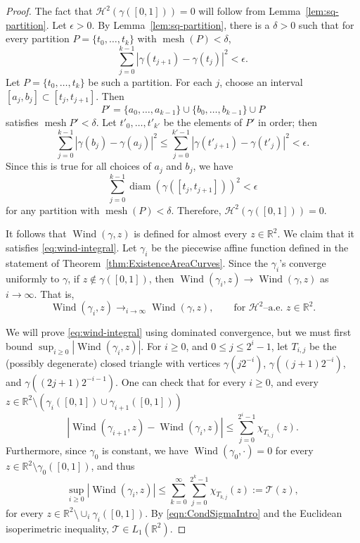 \documentclass[12pt,reqno]{amsart}
\DeclareMathOperator{\mesh}{mesh}
\newcommand{\R}{\mathbb{R}}
\theoremstyle{remark}
\newcommand{\0}{\mathbf{0}}
\renewcommand{\1}{\mathbf 1}
\DeclareMathOperator{\diam}{diam}
\DeclareMathOperator{\Wind}{Wind}
\begin{document}
\begin{proof}
  The fact that $\mathcal{H}^2(\gamma([0,1]))=0$ will follow from Lemma~\ref{lem:sq-partition}. Let $\epsilon>0$. By Lemma~\ref{lem:sq-partition}, there is a $\delta>0$ such that for every partition $P=\{t_0,\dots, t_k\}$ with $\mesh(P)<\delta$,
  \[\sum_{j=0}^{k-1}|\gamma(t_{j+1})-\gamma(t_j)|^2 <\epsilon.\]
  Let $P=\{t_0,\dots, t_k\}$ be such a partition. For each $j$, choose an interval $[a_j,b_j]\subset [t_j,t_{j+1}]$. Then
  $$P'=\{a_0,\dots, a_{k-1}\}\cup \{b_0,\dots, b_{k-1}\}\cup P$$
  satisfies $\mesh P' < \delta$. Let $t'_0,\dots,t'_{k'}$ be the elements of $P'$ in order; then
  \[\sum_{j=0}^{k-1}|\gamma(b_j)-\gamma(a_j)|^2 \le \sum_{j=0}^{k'-1}|\gamma(t'_{j+1})-\gamma(t'_j)|^2 <\epsilon.\]
  Since this is true for all choices of $a_j$ and $b_j$, we have
  \[\sum_{j=0}^{k-1}\diam(\gamma([t_j,t_{j+1}]))^2 < \epsilon\]
  for any partition with $\mesh(P)<\delta$. Therefore, $\mathcal{H}^2(\gamma([0,1]))=0$.

  It follows that $\Wind(\gamma,z)$ is defined for almost every $z\in \R^2.$ We claim that it satisfies \eqref{eq:wind-integral}. Let $\gamma_i$ be the piecewise affine function defined in the statement of Theorem~\ref{thm:ExistenceAreaCurves}. Since the $\gamma_i$'s converge uniformly to $\gamma$, if $z\notin \gamma([0,1])$, then $\Wind(\gamma_i,z)\to \Wind(\gamma,z)$ as $i\to\infty$. That is,
  \begin{equation}\label{eqn:aeconvergence}
    \Wind(\gamma_i,z)\to_{i\to\infty} \Wind(\gamma,z), \qquad \text{for $\mathcal{H}^2$--a.e. $z\in\mathbb R^2$}.
  \end{equation}

  We will prove \eqref{eq:wind-integral} using dominated convergence, but we must first bound $\sup_{i\geq 0}|\Wind(\gamma_{i},z)|$. For $i\geq 0$, and $0\leq j\leq 2^i-1$, let $T_{i,j}$ be the (possibly degenerate) closed triangle with vertices $\gamma(j2^{-i})$, $\gamma((j+1)2^{-i})$, and $\gamma((2j+1)2^{-i-1})$. One can check that for every $i\geq 0$, and every $z\in\mathbb R^2\setminus(\gamma_i([0,1])\cup\gamma_{i+1}([0,1]))$
  \[
    |\Wind(\gamma_{i+1},z)-\Wind(\gamma_i,z)|\leq \sum_{j=0}^{2^i-1}\chi_{T_{i,j}}(z).
  \]
  Furthermore, since $\gamma_0$ is constant, we have $\Wind(\gamma_0,\cdot)=0$ for every $z\in \mathbb R^2\setminus \gamma_0([0,1])$, and thus
  \begin{equation}\label{eqn:DomConT}
    \sup_{i\geq 0}|\Wind(\gamma_{i},z)|\leq \sum_{k=0}^{\infty}\sum_{j=0}^{2^k-1}\chi_{T_{k,j}}(z):=\mathcal{T}(z),
  \end{equation}
  for every $z\in\mathbb R^2\setminus\cup_i\gamma_i([0,1])$. By \eqref{eqn:CondSigmaIntro} and the Euclidean isoperimetric inequality, $\mathcal{T}\in L_1(\mathbb R^2)$. 


\end{proof}
\end{document}
